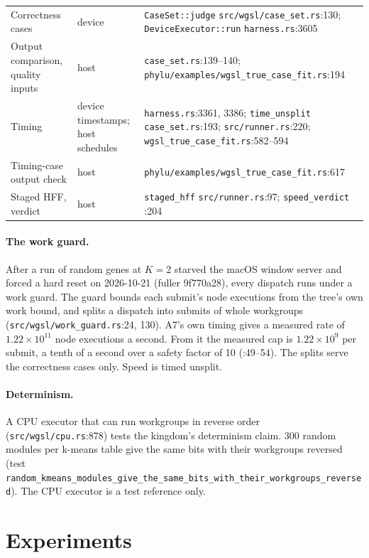 \documentclass[sigconf,nonacm]{acmart}
\newcommand{\code}[1]{\nolinkurl{#1}}
\newcommand{\src}[1]{{\footnotesize\nolinkurl{#1}}}
\begin{document}
\begin{table}[t]
\begin{tabularx}{\textwidth}{@{}lp{2.2cm}X@{}}
Correctness cases & device & \code{CaseSet::judge} \src{src/wgsl/case_set.rs}:130; \code{DeviceExecutor::run} \src{harness.rs}:3605\\
Output comparison, quality inputs & host & \src{case_set.rs}:139--140; \src{phylu/examples/wgsl_true_case_fit.rs}:194\\
Timing & device timestamps; host schedules & \src{harness.rs}:3361, 3386; \code{time_unsplit} \src{case_set.rs}:193; \src{src/runner.rs}:220; \src{wgsl_true_case_fit.rs}:582--594\\
Timing-case output check & host & \src{phylu/examples/wgsl_true_case_fit.rs}:617\\
Staged HFF, verdict & host & \code{staged_hff} \src{src/runner.rs}:97; \code{speed_verdict} :204\\
\bottomrule
\end{tabularx}
\end{table}

\paragraph{The work guard.} After a run of random genes at $K=2$ starved
the macOS window server and forced a hard reset on 2026-10-21 (fuller
9f770a28), every dispatch runs under a work guard. The guard bounds each
submit's node executions from the tree's own work bound, and splits a dispatch
into submits of whole workgroups (\src{src/wgsl/work_guard.rs}:24, 130). A7's
own timing gives a measured rate of $1.22\times10^{11}$ node executions a
second. From it the measured cap is $1.22\times10^{9}$ per submit, a tenth of a
second over a safety factor of 10 (:49--54). The splits serve the correctness
cases only. Speed is timed unsplit.

\paragraph{Determinism.} A CPU executor that can run workgroups in reverse
order (\src{src/wgsl/cpu.rs}:878) tests the kingdom's determinism claim.
300 random modules per k-means table give the same bits with their workgroups
reversed (test
\code{random_kmeans_modules_give_the_same_bits_with_their_workgroups_reversed}).
The CPU executor is a test reference only.

\section{Experiments}
\label{sec:exp}
\end{document}
